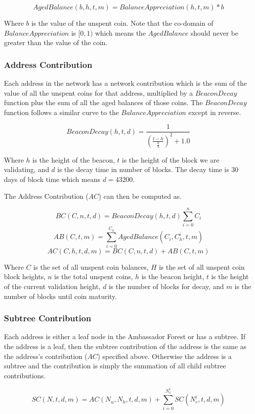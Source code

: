 \documentclass{article}
\begin{document}
$$AgedBalance(b,h,t,m) = BalanceAppreciation(h,t,m) * b$$

Where $b$ is the value of the unspent coin.  Note that the co-domain of
$BalanceAppreciation$ is $[0,1)$ which means the $AgedBalance$ should never
be greater than the value of the coin.

\subsubsection{Address Contribution}

Each address in the network has a network contribution which is the sum of the value
of all the unspent coins for that address, multiplied by a $BeaconDecay$ function
plus the sum of all the aged balances of those coins.  The $BeaconDecay$ function
follows a similar curve to the $BalanceAppreciation$ except in reverse.

$$BeaconDecay(h,t,d) = \frac{1}{(\frac{t-h}{\frac{d}{4}})^2 + 1.0}$$

Where $h$ is the height of the beacon, $t$ is the height of the block we are validating,
and $d$ is the decay time in number of blocks.  The decay time is 30 days of block
time which means $d = 43200$.

The Address Contribution ($AC$) can then be computed as.

$$BC(C,n,t,d)= BeaconDecay(h,t,d) \sum_{i=0}^{n} C_i$$
$$AB(C,t,m) = \sum_{i=0}^{C_n} AgedBalance(C_i,C_h^i,t,m)$$
$$AC(C,h,t,d,m) =  BC(C,n,t,d) + AB(C,t,m)$$

Where $C$ is the set of all unspent coin balances, $H$ is the set of all unspent
coin block heights, $n$ is the total unspent coins, $h$ is the beacon height, $t$
is the height of the current validation height, $d$ is the number of blocks for
decay, and $m$ is the number of blocks until coin maturity.

\subsubsection{Subtree Contribution}

Each address is either a leaf node in the Ambassador Forest or has a subtree.  If the
address is a leaf, then the subtree contribution of the address is the same as
the address's contribution ($AC$) specified above.  Otherwise the address is
a subtree and the contribution is simply the summation of all child subtree
contributions.

$$SC(N,t,d,m) = AC(N_u,N_h,t,d,m) + \sum_{i=0}^{N_c^t} SC(N_c^i,t,d,m)$$ 
\end{document}
